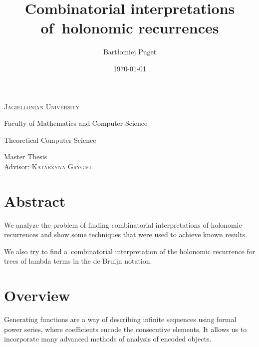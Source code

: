\documentclass[final]{article}
\title{Combinatorial interpretations of~holonomic recurrences}
\author{Bartłomiej Puget}
\date{\today}
\theoremstyle{definition}
\theoremstyle{definition}
\theoremstyle{remark}
\begin{document}
\begin{titlepage}
	\begin{center}
	\textsc{\LARGE Jagiellonian University}

	\Large Faculty of Mathematics and Computer Science

	\Large Theoretical Computer Science

	\vfill

	\vspace{1cm}
	\hrulefill
	\vspace{0.5cm}

    \makeatletter
    \huge \textsc{\@title}
    \makeatother

	\vspace{0.2cm}
	\hrulefill

	\vspace{1cm}
    \makeatletter
	\textsc{\Large \@author}
    \makeatother

	\vspace{1cm}
    \normalsize

	Master Thesis\\
	Advisor: \textsc{Katarzyna Grygiel}

	\vfill

    \makeatletter
    \@date
    \makeatother
	\end{center}
\end{titlepage}

\section*{Abstract}%
\label{sec:abstract}

We analyze the problem of finding combinatorial interpretations of holonomic recurrences and show some techniques that were used to achieve known results.

We also try to find a~combinatorial interpretation of the holonomic recurrence for trees of lambda terms in the de Bruijn notation.

\clearpage

\tableofcontents
\clearpage

\section{Overview}%

Generating functions are a way of describing infinite sequences using formal power series, where coefficients encode the consecutive elements. It allows us to incorporate many advanced methods of analysis of encoded objects.
\end{document}
